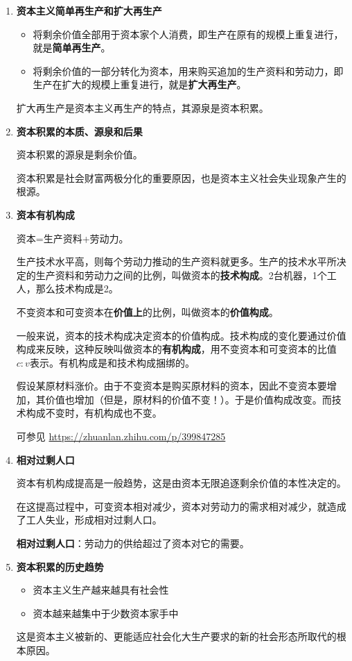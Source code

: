 \documentclass[12pt, a4paper, oneside]{ctexart}
\begin{document}
\begin{enumerate}
  \item {\bf 资本主义简单再生产和扩大再生产}
  
  \begin{itemize}
    \item 将剩余价值全部用于资本家个人消费，即生产在原有的规模上重复进行，就是\textbf{简单再生产}。
    \item 将剩余价值的一部分转化为资本，用来购买追加的生产资料和劳动力，即生产在扩大的规模上重复进行，就是\textbf{扩大再生产}。
  \end{itemize}

  扩大再生产是资本主义再生产的特点，其源泉是资本积累。

  \item {\bf 资本积累的本质、源泉和后果}
  
  资本积累的源泉是剩余价值。

  资本积累是社会财富两极分化的重要原因，也是资本主义社会失业现象产生的根源。

  \item {\bf 资本有机构成}
  
  资本=生产资料+劳动力。

  生产技术水平高，则每个劳动力推动的生产资料就更多。生产的技术水平所决定的生产资料和劳动力之间的比例，叫做资本的\textbf{技术构成}。2台机器，1个工人，那么技术构成是2。

  不变资本和可变资本在\textbf{价值上}的比例，叫做资本的\textbf{价值构成}。

  一般来说，资本的技术构成决定资本的价值构成。技术构成的变化要通过价值构成来反映，这种反映叫做资本的\textbf{有机构成}，用不变资本和可变资本的比值$c:v$表示。有机构成是和技术构成捆绑的。

  假设某原材料涨价。由于不变资本是购买原材料的资本，因此不变资本要增加，其价值也增加（但是，原材料的价值不变！）。于是价值构成改变。而技术构成不变时，有机构成也不变。

  可参见 \href{https://zhuanlan.zhihu.com/p/399847285}{https://zhuanlan.zhihu.com/p/399847285}

  \item {\bf 相对过剩人口}
  
  资本有机构成提高是一般趋势，这是由资本无限追逐剩余价值的本性决定的。

  在这提高过程中，可变资本相对减少，资本对劳动力的需求相对减少，就造成了工人失业，形成相对过剩人口。

  \textbf{相对过剩人口}：劳动力的供给超过了资本对它的需要。

  \item {\bf 资本积累的历史趋势}
  
  \begin{itemize}
    \item 资本主义生产越来越具有社会性
    \item 资本越来越集中于少数资本家手中
  \end{itemize}

  这是资本主义被新的、更能适应社会化大生产要求的新的社会形态所取代的根本原因。
\end{enumerate}
\end{document}
